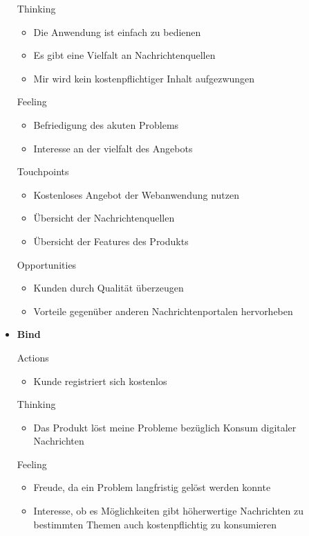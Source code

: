 \begin{itemize}
  Thinking

  \begin{itemize}
    \item Die Anwendung ist einfach zu bedienen
    \item Es gibt eine Vielfalt an Nachrichtenquellen
    \item Mir wird kein kostenpflichtiger Inhalt aufgezwungen
  \end{itemize}

  Feeling

  \begin{itemize}
    \item Befriedigung des akuten Problems
    \item Interesse an der vielfalt des Angebots
  \end{itemize}

  Touchpoints

  \begin{itemize}
    \item Kostenloses Angebot der Webanwendung nutzen
    \item Übersicht der Nachrichtenquellen
    \item Übersicht der Features des Produkts
  \end{itemize}

  Opportunities

  \begin{itemize}
    \item Kunden durch Qualität überzeugen
    \item Vorteile gegenüber anderen Nachrichtenportalen hervorheben
  \end{itemize}

  \item \textbf{Bind}

  Actions

  \begin{itemize}
    \item Kunde registriert sich kostenlos
  \end{itemize}

  Thinking

  \begin{itemize}
    \item Das Produkt löst meine Probleme bezüglich Konsum digitaler Nachrichten
  \end{itemize}

  Feeling

  \begin{itemize}
    \item Freude, da ein Problem langfristig gelöst werden konnte
    \item Interesse, ob es Möglichkeiten gibt höherwertige Nachrichten zu bestimmten Themen auch kostenpflichtig zu konsumieren
  \end{itemize}


\end{itemize}
